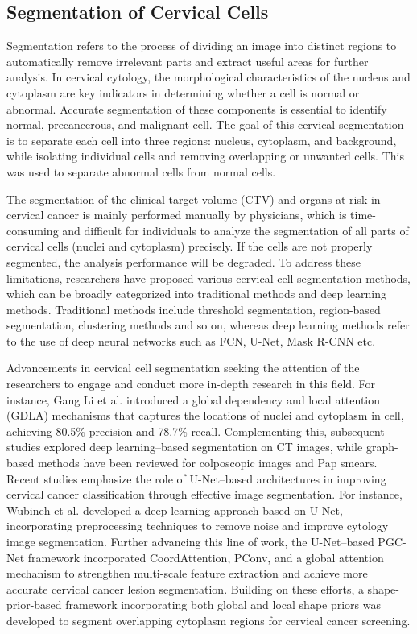 \documentclass[pdflatex,sn-nature]{sn-jnl}%
\theoremstyle{thmstyleone}%
\theoremstyle{thmstyletwo}%
\theoremstyle{thmstylethree}%
\begin{document}
\subsection{Segmentation of Cervical Cells}

Segmentation refers to the process of dividing an image into distinct regions to automatically remove irrelevant parts and extract useful areas for further analysis. In cervical cytology, the morphological characteristics of the nucleus and cytoplasm are key indicators in determining whether a cell is normal or abnormal. Accurate segmentation of these components is essential to identify normal, precancerous, and malignant cell. The goal of this cervical segmentation is to separate each cell into three regions:  nucleus, cytoplasm, and background, while isolating individual cells and removing overlapping or unwanted cells. This was used to separate abnormal cells from normal cells.

The segmentation of the clinical target volume (CTV) and organs at risk in cervical cancer is mainly performed manually by physicians, which is time-consuming and difficult for individuals to analyze the segmentation of all parts of cervical cells (nuclei and cytoplasm) precisely\cite{Lite21}. If the cells are not properly segmented, the analysis performance will be degraded. To address these limitations, researchers have proposed various cervical cell segmentation methods, which can be broadly categorized into traditional methods and deep learning methods. Traditional methods include threshold segmentation\cite{Lite22}, region-based segmentation\cite{Lite23}, clustering methods\cite{Lite24} and so on, whereas deep learning methods refer to the use of deep neural networks such as FCN\cite{Lite25}, U-Net\cite{Lite7}, Mask R-CNN\cite{Lite26} etc.

Advancements in cervical cell segmentation seeking the attention of the researchers to engage and conduct more in-depth research in this field. For instance, Gang Li et al.\cite{Lite27} introduced a global dependency and local attention (GDLA) mechanisms that captures the locations of nuclei and cytoplasm in cell, achieving 80.5\% precision and 78.7\% recall. Complementing this, subsequent studies explored deep learning–based segmentation on CT images\cite{Lite28}, while graph-based methods have been reviewed for colposcopic images and Pap smears\cite{Lite29}.  Recent studies emphasize the role of U-Net–based architectures in improving cervical cancer classification through effective image segmentation. For instance, Wubineh et al.\cite{Lite20} developed a deep learning approach based on U-Net, incorporating preprocessing techniques to remove noise and improve cytology image segmentation. Further advancing this line of work, the U-Net–based PGC-Net framework incorporated CoordAttention, PConv, and a global attention mechanism to strengthen multi-scale feature extraction and achieve more accurate cervical cancer lesion segmentation\cite{Lite30}. Building on these efforts, a shape-prior-based framework incorporating both global and local shape priors was developed to segment overlapping cytoplasm regions for cervical cancer screening\cite{Lite31}. 
\end{document}

